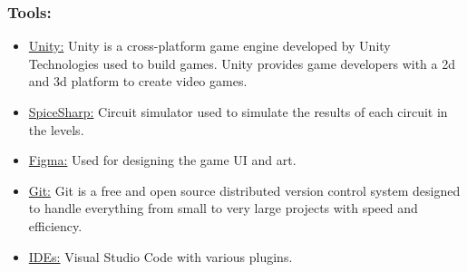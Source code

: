 \documentclass[../main.tex]{subfiles}
\begin{document}
\subsubsection{Tools:} 
\begin{itemize}
    \item \underline{Unity:} Unity is a cross-platform game engine developed by Unity Technologies used to build games. Unity provides game developers with a \acrshort{2d} and  \acrshort{3d} platform to create video games.
    \item \underline{SpiceSharp:} Circuit simulator used to simulate the results of each circuit in the levels. 
     \item \underline{Figma:} Used for designing the game UI and art.
      \item \underline{Git:} Git is a free and open source distributed version control system designed to handle everything from small to very large projects with speed and efficiency.
      \item \underline{IDEs:} Visual Studio Code with various plugins.
\end{itemize}
\end{document}
